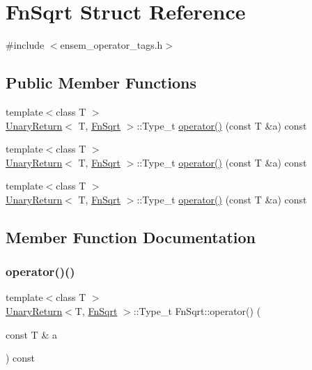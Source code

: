 \hypertarget{structFnSqrt}{}\section{Fn\+Sqrt Struct Reference}
\label{structFnSqrt}


{\ttfamily \#include $<$ensem\+\_\+operator\+\_\+tags.\+h$>$}

\subsection*{Public Member Functions}
\begin{DoxyCompactItemize}
\item 
{\footnotesize template$<$class T $>$ }\\\mbox{\hyperlink{structUnaryReturn}{Unary\+Return}}$<$ T, \mbox{\hyperlink{structFnSqrt}{Fn\+Sqrt}} $>$\+::Type\+\_\+t \mbox{\hyperlink{structFnSqrt_a019bed3e40dc318937e7655b3e4222bb}{operator()}} (const T \&a) const
\item 
{\footnotesize template$<$class T $>$ }\\\mbox{\hyperlink{structUnaryReturn}{Unary\+Return}}$<$ T, \mbox{\hyperlink{structFnSqrt}{Fn\+Sqrt}} $>$\+::Type\+\_\+t \mbox{\hyperlink{structFnSqrt_a019bed3e40dc318937e7655b3e4222bb}{operator()}} (const T \&a) const
\item 
{\footnotesize template$<$class T $>$ }\\\mbox{\hyperlink{structUnaryReturn}{Unary\+Return}}$<$ T, \mbox{\hyperlink{structFnSqrt}{Fn\+Sqrt}} $>$\+::Type\+\_\+t \mbox{\hyperlink{structFnSqrt_a019bed3e40dc318937e7655b3e4222bb}{operator()}} (const T \&a) const
\end{DoxyCompactItemize}


\subsection{Member Function Documentation}
\mbox{\label{structFnSqrt_a019bed3e40dc318937e7655b3e4222bb}} 
\subsubsection{\texorpdfstring{operator()()}{operator()()}\hspace{0.1cm}{\footnotesize\ttfamily [1/3]}}
{\footnotesize\ttfamily template$<$class T $>$ \\
\mbox{\hyperlink{structUnaryReturn}{Unary\+Return}}$<$T, \mbox{\hyperlink{structFnSqrt}{Fn\+Sqrt}} $>$\+::Type\+\_\+t Fn\+Sqrt\+::operator() (\begin{DoxyParamCaption}\item[{const T \&}]{a }\end{DoxyParamCaption}) const\hspace{0.3cm}{\ttfamily [inline]}}

